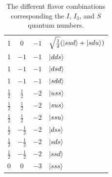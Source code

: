 \begin{table}
\begin{minipage}{.49\linewidth}
\begin{tabular}{|c|c|c|l|}
 1 & 0 & $-1$ & $\sqrt{\frac{1}{2}}(\ket{sud}+\ket{sdu})$\\
 1 & $-1$ & $-1$ & $\ket{dds}$\\ 
 1 & $-1$ & $-1$ & $\ket{dsd}$\\ 
 1 & $-1$ & $-1$ & $\ket{sdd}$\\ \hline
 $\frac{1}{2}$ & $\frac{1}{2}$ & $-2$ & $\ket{uss}$\\
 $\frac{1}{2}$ & $\frac{1}{2}$ & $-2$ & $\ket{sus}$\\
 $\frac{1}{2}$ & $\frac{1}{2}$ & $-2$ & $\ket{ssu}$\\
 $\frac{1}{2}$ & $-\frac{1}{2}$ & $-2$ & $\ket{dss}$\\ 
 $\frac{1}{2}$ & $-\frac{1}{2}$ & $-2$ & $\ket{sds}$\\ 
 $\frac{1}{2}$ & $-\frac{1}{2}$ & $-2$ & $\ket{ssd}$\\ \hline
 0 & 0 & $-3$ & $\ket{sss}$ \\
\hline
            \end{tabular}
        \end{minipage}
        \caption{The different flavor combinations corresponding the $I$, $I_3$, and $S$ quantum numbers.}
        \label{table:baryon_flavor}
    \end{table}
    

